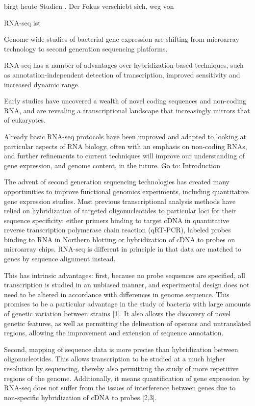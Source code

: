 \documentclass[a4paper]{thesis}
\begin{document}
 birgt
heute 
Studien . Der Fokus verschiebt sich, weg von


RNA-seq ist 

Genome-wide studies of bacterial gene expression are shifting from microarray technology to second generation sequencing platforms.

 RNA-seq has a number of advantages over hybridization-based techniques, such as annotation-independent detection of transcription, improved sensitivity and increased dynamic range.

 Early studies have uncovered a wealth of novel coding sequences and non-coding RNA, and are revealing a transcriptional landscape that increasingly mirrors that of eukaryotes.

 Already basic RNA-seq protocols have been improved and adapted to looking at particular aspects of RNA biology, often with an emphasis on non-coding RNAs, and further refinements to current techniques will improve our understanding of gene expression, and genome content, in the future.
Go to:
Introduction

The advent of second generation sequencing technologies has created many opportunities to improve functional genomics experiments, including quantitative gene expression studies. Most previous transcriptional analysis methods have relied on hybridization of targeted oligonucleotides to particular loci for their sequence specificity: either primers binding to target cDNA in quantitative reverse transcription polymerase chain reaction (qRT-PCR), labeled probes binding to RNA in Northern blotting or hybridization of cDNA to probes on microarray chips. RNA-seq is different in principle in that data are matched to genes by sequence alignment instead.

This has intrinsic advantages: first, because no probe sequences are specified, all transcription is studied in an unbiased manner, and experimental design does not need to be altered in accordance with differences in genome sequence. This promises to be a particular advantage in the study of bacteria with large amounts of genetic variation between strains [1]. It also allows the discovery of novel genetic features, as well as permitting the delineation of operons and untranslated regions, allowing the improvement and extension of sequence annotation.



Second, mapping of sequence data is more precise than hybridization between oligonucleotides. This allows transcription to be studied at a much higher resolution by sequencing, thereby also permitting the study of more repetitive regions of the genome. Additionally, it means quantification of gene expression by RNA-seq does not suffer from the issues of interference between genes due to non-specific hybridization of cDNA to probes [2,3].
\end{document}
